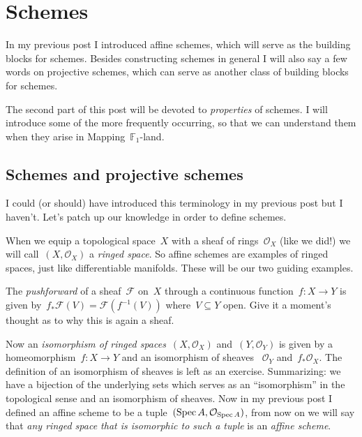 \section{Schemes}

In my previous post I introduced affine schemes, which will serve as the building blocks for schemes. Besides constructing schemes in general I will also say a few words on projective schemes, which can serve as another class of building blocks for schemes.

The second part of this post will be devoted to \emph{properties} of schemes. I will introduce some of the more frequently occurring, so that we can understand them when they arise in \iftex\cite{mapping-fun}\fi\ifblog Mapping~$\mathbb{F}_1$-land\fi.

\subsection{Schemes and projective schemes}
I could (or should) have introduced this terminology in my previous post but I haven't. Let's patch up our knowledge in order to define schemes.

\begin{definition}
  When we equip a topological space~$X$ with a sheaf of rings~$\mathcal{O}_X$ (like we did!) we will call~$(X,\mathcal{O}_X)$ a \emph{ringed space}. So affine schemes are examples of ringed spaces, just like differentiable manifolds. These will be our two guiding examples.
\end{definition}

\begin{definition}
  The \emph{pushforward} of a sheaf~$\mathcal{F}$ on~$X$ through a continuous function~$f\colon X\to Y$ is given by~$f_\ast\mathcal{F}(V)=\mathcal{F}(f^{-1}(V))$ where~$V\subseteq Y$ open. Give it a moment's thought as to why this is again a sheaf.
\end{definition}

\begin{definition}
  Now an \emph{isomorphism of ringed spaces}~$(X,\mathcal{O}_X)$ and~$(Y,\mathcal{O}_Y)$ is given by a homeomorphism~$f\colon X\to Y$ and an isomorphism of sheaves ~$\mathcal{O}_Y$ and~$f_\ast\mathcal{O}_X$. The definition of an isomorphism of sheaves is left as an exercise. Summarizing: we have a bijection of the underlying sets which serves as an ``isomorphism'' in the topological sense and an isomorphism of sheaves. Now in my previous post I defined an affine scheme to be a tuple~$(\operatorname{Spec} A,\mathcal{O}_{\operatorname{Spec} A})$, from now on we will say that \emph{any ringed space that is isomorphic to such a tuple} is an \emph{affine scheme}.
\end{definition}

